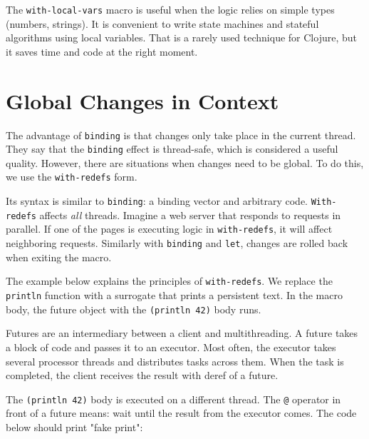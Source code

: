 \fi

The \verb|with-local-vars| macro is useful when the logic relies on simple types (numbers, strings).
It is convenient to write state machines and stateful algorithms using local variables.
That is a rarely used technique for Clojure, but it saves time and code at the right moment.

\section{Global Changes in Context}


\label{with-redefs}

The advantage of \verb|binding| is that changes only take place in the current thread.
They say that the \verb|binding| effect is thread-safe, which is considered a useful quality.
However, there are situations when changes need to be global.
To do this, we use the \verb|with-redefs| form.

\mnoindent
Its syntax is similar to \verb|binding|: a binding vector and arbitrary code. \verb|With-redefs| affects \emph{all} threads.
Imagine a web server that responds to requests in parallel.
If one of the pages is executing logic in \verb|with-redefs|, it will affect neighboring requests.
Similarly with \verb|binding| and \verb|let|, changes are rolled back when exiting the macro.

The example below explains the principles of \texttt{with\--redefs}.
We replace the \verb|println| function with a surrogate that prints a persistent text.
In the macro body, the future object with the \verb|(println 42)| body runs.


Futures are an intermediary between a client and multithreading.
A future takes a block of code and passes it to an executor.
Most often, the executor takes several processor threads and distributes tasks across them.
When the task is completed, the client receives the result with deref of a future.

The \verb|(println 42)| body is executed on a different thread.
The \verb|@| operator in front of a future means: wait until the result from the executor comes.
The code below should print "fake print":


\ifx\DEVICETYPE\MOBILE

